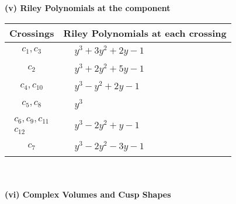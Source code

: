 \documentclass[1p]{elsarticle_modified}
\theoremstyle{definition}
\begin{document}
\newpage\renewcommand{\arraystretch}{1}
\flushleft \textbf{(v) Riley Polynomials at the component}\newline \\
\begin{tabular}{m{50pt}|m{274pt}}
Crossings & \hspace{64pt}Riley Polynomials at each crossing \\
\hline $$\begin{aligned}c_{1},c_{3}\end{aligned}$$&$\begin{aligned}
&y^3+3 y^2+2 y-1
\end{aligned}$\\
\hline $$\begin{aligned}c_{2}\end{aligned}$$&$\begin{aligned}
&y^3+2 y^2+5 y-1
\end{aligned}$\\
\hline $$\begin{aligned}c_{4},c_{10}\end{aligned}$$&$\begin{aligned}
&y^3- y^2+2 y-1
\end{aligned}$\\
\hline $$\begin{aligned}c_{5},c_{8}\end{aligned}$$&$\begin{aligned}
&y^3
\end{aligned}$\\
\hline $$\begin{aligned}c_{6},c_{9},c_{11}\\c_{12}\end{aligned}$$&$\begin{aligned}
&y^3-2 y^2+y-1
\end{aligned}$\\
\hline $$\begin{aligned}c_{7}\end{aligned}$$&$\begin{aligned}
&y^3-2 y^2-3 y-1
\end{aligned}$\\
\hline
\end{tabular}\\~\\
\newpage\flushleft \textbf{(vi) Complex Volumes and Cusp Shapes}
\end{document}

